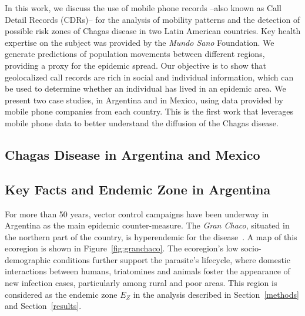 In this work, we discuss the use of mobile phone records --also known as Call Detail Records (CDRs)-- for the analysis of mobility patterns and the detection of possible risk zones of Chagas disease in two Latin American countries. Key health expertise on the subject was provided by the \textit{Mundo Sano} Foundation.
 We generate predictions of population movements between different regions, providing a proxy for the epidemic spread. Our objective is to show that geolocalized call records are rich in social and individual information, which can be used to determine whether an individual has lived in an epidemic area. We present two case studies, in Argentina and in Mexico, using data provided by mobile phone companies from each country. %
This is the first work that leverages mobile phone data to better understand the diffusion of the Chagas disease.






\subsection{Chagas Disease in Argentina and Mexico}

\subsection{Key Facts and Endemic Zone in Argentina}\label{endemic_zone_argentina}

For more than 50 years, vector control campaigns have been underway in Argentina as the main epidemic counter-measure. The \textit{Gran Chaco}, situated in the northern part of the country,
is hyperendemic for the disease~\cite{OPS2014mapa}. A map of this ecoregion is shown in Figure~\ref{fig:granchaco}.
The ecoregion's low socio-demographic conditions further support the parasite's lifecycle, where domestic interactions between humans, triatomines and animals foster the appearance of new infection cases, particularly among rural and poor areas.
This region is considered as the endemic zone $E_Z$ in the analysis described in Section~\ref{methods} and Section~\ref{results}.

